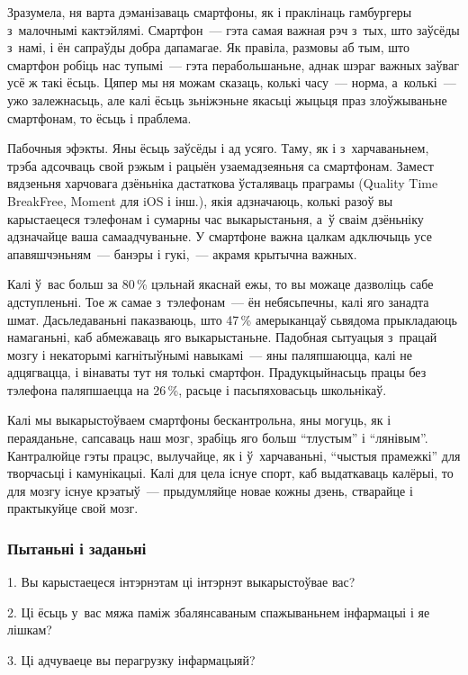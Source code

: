 Зразумела, ня варта дэманізаваць смартфоны, як і праклінаць гамбургеры з~малочнымі кактэйлямі. Смартфон~--- гэта самая важная рэч з~тых, што заўсёды з~намі, і ён сапраўды добра дапамагае. Як правіла, размовы аб тым, што смартфон робіць нас тупымі~--- гэта перабольшаньне, аднак шэраг важных заўваг усё ж такі ёсьць. Цяпер мы ня можам сказаць, колькі часу~--- норма, а~колькі~--- ужо залежнасьць, але калі ёсьць зьніжэньне якасьці жыцьця праз злоўжываньне смартфонам, то ёсьць і праблема.

Пабочныя эфэкты. Яны ёсьць заўсёды і ад усяго. Таму, як і з~харчаваньнем, трэба адсочваць свой рэжым і рацыён узаемадзеяньня са смартфонам. Замест вядзеньня харчовага дзёньніка дастаткова ўсталяваць праграмы (Quality Time BreakFree, Moment для iOS і інш.), якія адзначаюць, колькі разоў вы карыстаецеся тэлефонам і сумарны час выкарыстаньня, а~ў сваім дзёньніку адзначайце ваша самаадчуваньне. У смартфоне важна цалкам адключыць усе апавяшчэньням~--- банэры і гукі,~--- акрамя крытычна важных. 

Калі ў~вас больш за 80\,\% цэльнай якаснай ежы, то вы можаце дазволіць сабе адступленьні. Тое ж самае з~тэлефонам~--- ён небясьпечны, калі яго занадта шмат. Дасьледаваньні паказваюць, што 47\,\% амерыканцаў сьвядома прыкладаюць намаганьні, каб абмежаваць яго выкарыстаньне. Падобная сытуацыя з~працай мозгу і некаторымі кагнітыўнымі навыкамі~--- яны паляпшаюцца, калі не адцягвацца, і вінаваты тут ня толькі смартфон. Прадукцыйнасьць працы без тэлефона паляпшаецца на 26\,\%, расьце і пасьпяховасьць школьнікаў.

Калі мы выкарыстоўваем смартфоны бескантрольна, яны могуць, як і пераяданьне, сапсаваць наш мозг, зрабіць яго больш ``тлустым'' і ``лянівым''. Кантралюйце гэты працэс, вылучайце, як і ў~харчаваньні, ``чыстыя прамежкі'' для творчасьці і камунікацыі. Калі для цела існуе спорт, каб выдаткаваць калёрыі, то для мозгу існуе крэатыў~--- прыдумляйце новае кожны дзень, стварайце і практыкуйце свой мозг.

\subsubsection{Пытаньні і заданьні}

1. Вы карыстаецеся інтэрнэтам ці інтэрнэт выкарыстоўвае вас?

2. Ці ёсьць у~вас мяжа паміж збалянсаваным спажываньнем інфармацыі і яе лішкам?

3. Ці адчуваеце вы перагрузку інфармацыяй?



